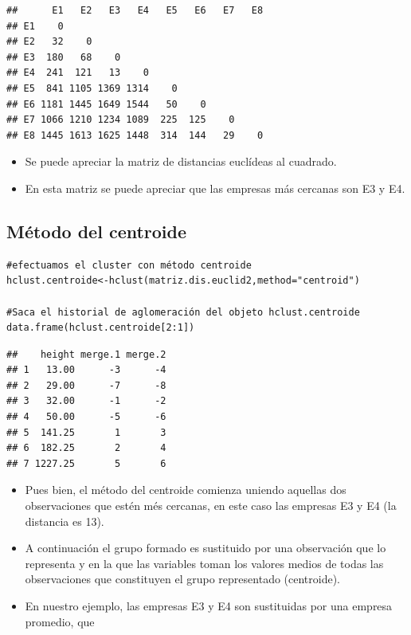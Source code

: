 \documentclass[]{article}
\providecommand{\tightlist}{%
  \setlength{\itemsep}{0pt}\setlength{\parskip}{0pt}}
\begin{document}
\hypertarget{left}{}
\begin{verbatim}
##      E1   E2   E3   E4   E5   E6   E7   E8
## E1    0                                   
## E2   32    0                              
## E3  180   68    0                         
## E4  241  121   13    0                    
## E5  841 1105 1369 1314    0               
## E6 1181 1445 1649 1544   50    0          
## E7 1066 1210 1234 1089  225  125    0     
## E8 1445 1613 1625 1448  314  144   29    0
\end{verbatim}

\hypertarget{right}{}
\begin{itemize}
\tightlist
\item
  Se puede apreciar la matriz de distancias euclídeas al cuadrado.
\item
  En esta matriz se puede apreciar que las empresas más cercanas son E3
  y E4.
\end{itemize}

\subsection{Método del centroide}\label{muxe9todo-del-centroide-1}

\hypertarget{left}{}
\begin{verbatim}
#efectuamos el cluster con método centroide
hclust.centroide<-hclust(matriz.dis.euclid2,method="centroid")

#Saca el historial de aglomeración del objeto hclust.centroide
data.frame(hclust.centroide[2:1])
\end{verbatim}

\begin{verbatim}
##    height merge.1 merge.2
## 1   13.00      -3      -4
## 2   29.00      -7      -8
## 3   32.00      -1      -2
## 4   50.00      -5      -6
## 5  141.25       1       3
## 6  182.25       2       4
## 7 1227.25       5       6
\end{verbatim}

\hypertarget{right}{}
\begin{itemize}
\tightlist
\item
  Pues bien, el método del centroide comienza uniendo aquellas dos
  observaciones que estén més cercanas, en este caso las empresas E3 y
  E4 (la distancia es 13).
\item
  A continuación el grupo formado es sustituido por una observación que
  lo representa y en la que las variables toman los valores medios de
  todas las observaciones que constituyen el grupo representado
  (centroide).
\item
  En nuestro ejemplo, las empresas E3 y E4 son sustituidas por una
  empresa promedio, que
\end{itemize}
\end{document}

